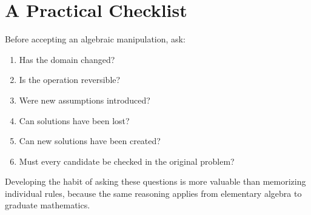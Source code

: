 \documentclass{essay}
\begin{document}
\section{A Practical Checklist}

Before accepting an algebraic manipulation, ask:

\begin{enumerate}
  \item Has the domain changed?
  \item Is the operation reversible?
  \item Were new assumptions introduced?
  \item Can solutions have been lost?
  \item Can new solutions have been created?
  \item Must every candidate be checked in the original problem?
\end{enumerate}

Developing the habit of asking these questions is more valuable than memorizing
individual rules, because the same reasoning applies from elementary algebra to
graduate mathematics.
\end{document}
